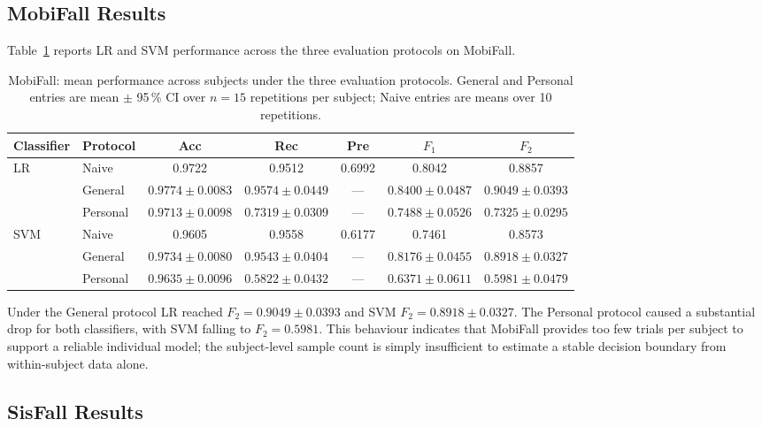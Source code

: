\subsection{MobiFall Results}
\label{subsubsec:mobifall_results}

Table~\ref{tab:mobifall_results} reports LR and SVM performance across the three evaluation protocols on MobiFall.

\begin{table}[h!]
\centering
\caption{MobiFall: mean performance across subjects under the three evaluation
  protocols.  General and Personal entries are mean $\pm$ 95\,\% CI over
  $n = 15$ repetitions per subject; Naive entries are means over 10 repetitions.}
\label{tab:mobifall_results}
\setlength{\tabcolsep}{3pt}\footnotesize
\begin{tabular}{llccccc}
\toprule
\textbf{Classifier} & \textbf{Protocol}
  & \textbf{Acc} & \textbf{Rec} & \textbf{Pre}
  & \textbf{$F_1$} & \textbf{$F_2$} \\
\midrule
\multirow{3}{*}{LR}
 & Naive
   & 0.9722 & 0.9512 & 0.6992 & 0.8042 & 0.8857 \\
 & General
   & $0.9774 \pm 0.0083$ & $0.9574 \pm 0.0449$ & ---
   & $0.8400 \pm 0.0487$ & $0.9049 \pm 0.0393$ \\
 & Personal
   & $0.9713 \pm 0.0098$ & $0.7319 \pm 0.0309$ & ---
   & $0.7488 \pm 0.0526$ & $0.7325 \pm 0.0295$ \\
\midrule
\multirow{3}{*}{SVM}
 & Naive
   & 0.9605 & 0.9558 & 0.6177 & 0.7461 & 0.8573 \\
 & General
   & $0.9734 \pm 0.0080$ & $0.9543 \pm 0.0404$ & ---
   & $0.8176 \pm 0.0455$ & $0.8918 \pm 0.0327$ \\
 & Personal
   & $0.9635 \pm 0.0096$ & $0.5822 \pm 0.0432$ & ---
   & $0.6371 \pm 0.0611$ & $0.5981 \pm 0.0479$ \\
\bottomrule
\end{tabular}
\end{table}

Under the General protocol LR reached $F_2 = 0.9049 \pm 0.0393$ and SVM $F_2 = 0.8918 \pm 0.0327$. The Personal protocol caused a substantial drop for both classifiers, with SVM falling to $F_2 = 0.5981$. This behaviour indicates that MobiFall provides too few trials per subject to support a reliable individual model; the subject-level sample count is simply insufficient to estimate a stable decision boundary from within-subject data alone.

\subsection{SisFall Results}
\label{subsubsec:sisfall_results}

